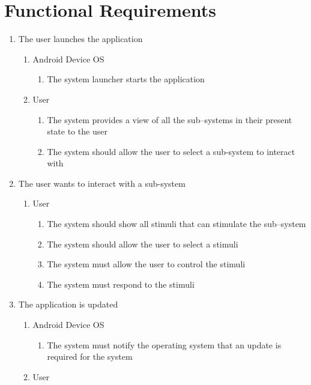 \documentclass[]{article}
\begin{document}
\section{Functional Requirements}
\label{sec:functional_requirements}

\begin{enumerate}
	\item The user launches the application
	\begin{enumerate}
		\item Android Device OS
			\begin{enumerate}
				\item The system launcher starts the application
			\end{enumerate}
		\item User
			\begin{enumerate}
				\item The system provides a view of all the sub--systems in their present state to the user
				\item The system should allow the user to select a sub-system to interact with
			\end{enumerate}
	\end{enumerate}
	\item The user wants to interact with a sub-system
	\begin{enumerate}
		\item User
			\begin{enumerate}
				\item The system should show all stimuli that can stimulate the sub--system
				\item The system should allow the user to select a stimuli
				\item The system must allow the user to control the stimuli
				\item The system must respond to the stimuli
			\end{enumerate}
	\end{enumerate}
	\item The application is updated
	\begin{enumerate}
		\item Android Device OS
			\begin{enumerate}
				\item The system must notify the operating system that an update is required for the system
			\end{enumerate}
		\item User
			\begin{enumerate}

\end{enumerate}
\end{enumerate}
\end{enumerate}
\end{document}
